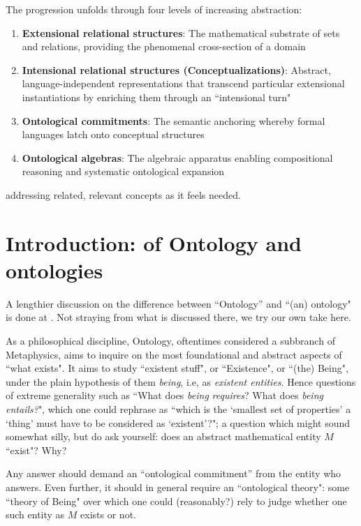 \documentclass[12pt,a4paper]{article}
\begin{document}
The progression unfolds through four levels of increasing abstraction:
\begin{enumerate}[label=(\roman*)]
    \item \textbf{Extensional relational structures}: The mathematical substrate of sets and relations, providing the phenomenal cross-section of a domain
    \item \textbf{Intensional relational structures (Conceptualizations)}: Abstract, language-independent representations that transcend particular extensional instantiations by enriching them through an ``intensional turn"
    \item \textbf{Ontological commitments}: The semantic anchoring whereby formal languages latch onto conceptual structures
    \item \textbf{Ontological algebras}: The algebraic apparatus enabling compositional reasoning and systematic ontological expansion
\end{enumerate}

addressing related, relevant concepts as it feels needed.

\section{Introduction: of Ontology and ontologies}

A lengthier discussion on the difference between ``Ontology'' and ``(an) ontology" is done at \citet{guarino2009}. Not straying from what is discussed there, we try our own take here.

As a philosophical discipline, Ontology, oftentimes considered a subbranch of Metaphysics, aims to inquire on the most foundational and abstract aspects of ``what exists". It aims to study ``existent stuff", or ``Existence", or ``(the) Being", under the plain hypothesis of them \textit{being}, i.e, as \textit{existent entities}. Hence questions of extreme generality such as ``What does \textit{being} \textit{requires}? What does \textit{being} \textit{entails?}", which one could rephrase as ``which is the `smallest set of properties' a `thing' must have to be considered as `existent'?"; a question which might sound somewhat silly, but do ask yourself: does an abstract mathematical entity $M$ ``exist"? Why? 

Any answer should demand an ``ontological commitment'' from the entity who answers. Even further, it should in general require an ``ontological theory": some ``theory of Being" over which one could (reasonably?) rely to judge whether one such entity as $M$ exists or not.
\end{document}

